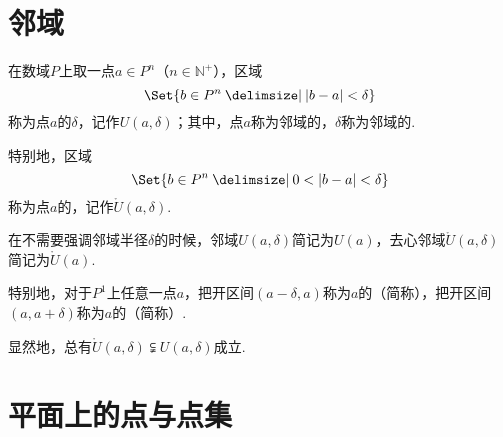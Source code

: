 \section{邻域}
\begin{definition}
在数域\(P\)上取一点\(a \in P^n\)（\(n\in\mathbb{N}^+\)），区域\[
\Set{b \in P^n \given \abs{b - a} < \delta}
\]称为点\(a\)的\(\delta\)，记作\(U(a,\delta)\)；其中，点\(a\)称为邻域的，\(\delta\)称为邻域的.

特别地，区域\[
\Set{b \in P^n \given 0 < \abs{b - a} < \delta}
\]称为点\(a\)的，记作\(\mathring{U}(a,\delta)\).

在不需要强调邻域半径\(\delta\)的时候，邻域\(U(a,\delta)\)简记为\(U(a)\)，去心邻域\(\mathring{U}(a,\delta)\)简记为\(\mathring{U}(a)\).

特别地，对于\(P^1\)上任意一点\(a\)，把开区间\((a-\delta,a)\)称为\(a\)的（简称），把开区间\((a,a+\delta)\)称为\(a\)的（简称）.
\end{definition}

\begin{property}
显然地，总有\(\mathring{U}(a,\delta) \subsetneqq U(a,\delta)\)成立.
\end{property}

\section{平面上的点与点集}
